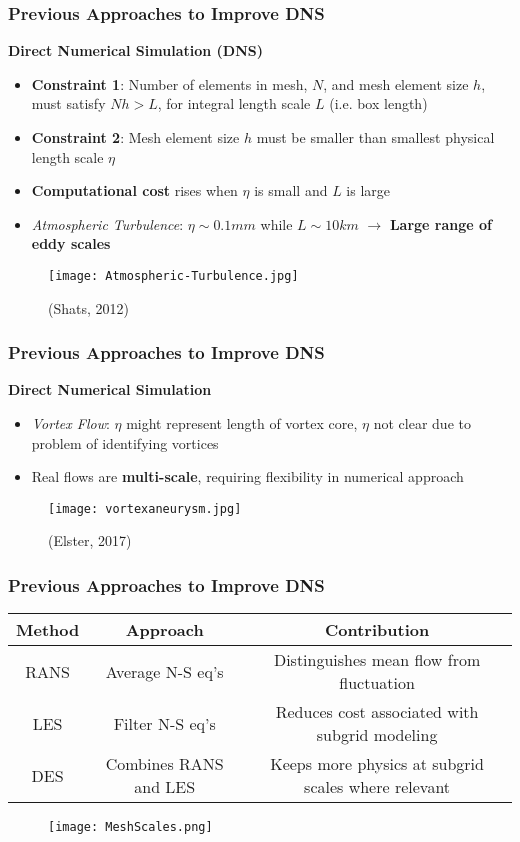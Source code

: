 \documentclass{beamer}
\begin{document}
\begin{frame}
\frametitle{Previous Approaches to Improve DNS}
\textbf{\Large Direct Numerical Simulation (DNS)}
\begin{multicols}{2}
\begin{itemize}
\item \textbf{Constraint 1}: Number of elements in mesh, $N$, and mesh element 
size $h$, must satisfy $Nh > L$, for integral length scale $L$ (i.e. box length)
\pause
\item \textbf{Constraint 2}: Mesh element size $h$ must be smaller than 
smallest physical length scale $\eta$
\pause
\item \textbf{Computational cost} rises when $\eta$ is small and $L$ is large
\pause
\item \textit{Atmospheric Turbulence}: $\eta \sim 0.1mm$ while $L \sim
10 km$ $\rightarrow$ \textbf{Large range of eddy scales}
\end{itemize}
\begin{figure}
 \texttt{[image: Atmospheric-Turbulence.jpg]}
 \caption{\tiny (Shats, 2012) }
\end{figure}
\end{multicols}
\end{frame}
\begin{frame}
\frametitle{Previous Approaches to Improve DNS}
\textbf{\Large Direct Numerical Simulation}
\begin{multicols}{2}
\begin{itemize}
\item \textit{Vortex Flow}: $\eta$ might represent length of vortex core, 
$\eta$ not clear due to problem of identifying vortices
\item Real flows are \textbf{multi-scale}, requiring flexibility in numerical approach
\end{itemize}
\begin{figure}
 \texttt{[image: vortexaneurysm.jpg]}
 \caption{\tiny (Elster, 2017)}
\end{figure}
\end{multicols}
\end{frame}
\begin{frame}
 \frametitle{Previous Approaches to Improve DNS}
 \begin{table}[t!]
 \begin{tabular}{|| c | c | c ||}
  \hline
  Method & Approach & Contribution \\ [0.5ex]
  \hline\hline
  RANS & \scriptsize Average N-S eq's & \scriptsize Distinguishes mean flow from fluctuation\\
  \hline
  LES & \scriptsize Filter N-S eq's & \scriptsize Reduces cost associated with subgrid modeling\\
  \hline
  DES & \scriptsize Combines RANS and LES & \scriptsize Keeps more physics at subgrid scales where relevant \\
  \hline
 \end{tabular}
 \end{table}
  \begin{figure}
  \texttt{[image: MeshScales.png]}
 \end{figure}
\end{frame}
\end{document}
